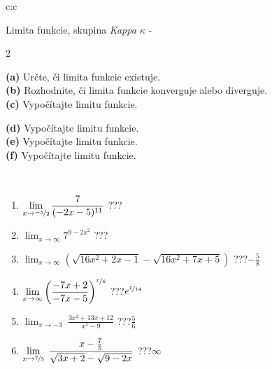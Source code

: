 \documentclass[10pt]{report}
\begin{document}
\newpage
\thispagestyle{empty}
\begin{tabular}{c:c}
\begin{minipage}[c][104.5mm][t]{0.5\linewidth}
\begin{center}
\vspace{7mm}
{\huge Limita funkcie, skupina \textit{Kappa $\kappa$} -}\\[5mm]
\begin{minipage}{0.95\linewidth}
\begin{center}
{\small \begin{multicols}{2} \raggedright
\textbf{(a)} Určte, či limita funkcie existuje. \\[1mm]
\textbf{(b)} Rozhodnite, či limita funkcie konverguje alebo diverguje. \\[1mm]
\textbf{(c)} Vypočítajte limitu funkcie. \par \columnbreak
\textbf{(d)} Vypočítajte limitu funkcie. \\[1mm]
\textbf{(e)} Vypočítajte limitu funkcie. \\[1mm]
\textbf{(f)} Vypočítajte limitu funkcie. \\[1mm]
\end{multicols}
}
\end{center}
\end{minipage}
\\[4mm]
\begin{minipage}{0.79\linewidth}
\begin{center}
\begin{varwidth}{\linewidth}
\begin{enumerate}
\normalsize
\item $\displaystyle\lim_{x\to\nicefrac{-5}{2}}{\frac{7}{(-2x-5)^{11}}}$\quad \dotfill\; ???\;\dotfill \quad {}
\item $\displaystyle\lim_{x\to\infty}{7^{9-2x^2}}$\quad \dotfill\; ???\;\dotfill \quad {}
\item $\displaystyle\lim_{x\to\infty}{\left(\sqrt{16x^2+2x-1} - \sqrt{16x^2+7x+5}\right)}$\quad \dotfill\; ???\;\dotfill \quad $-\frac{5}{8}$
\item $\displaystyle\lim_{x\to\infty}{\left( \frac{-7x+2}{-7x-5} \right)^{\nicefrac{x}{6}}}$\quad \dotfill\; ???\;\dotfill \quad $e^{\nicefrac{1}{14}}$
\item $\displaystyle\lim_{x\to -3}{\;\frac{3x^2+13x+12}{x^2-9}}$\quad \dotfill\; ???\;\dotfill \quad $\frac{5}{6}$
\item $\displaystyle\lim_{x\to \nicefrac{7}{5}}{\;\frac{x-\frac{7}{5}}{\sqrt{3x+2} - \sqrt{9-2x}}}$\quad \dotfill\; ???\;\dotfill \quad $\infty$

\end{enumerate}
\end{varwidth}
\end{center}
\end{minipage}
\end{center}
\end{minipage}
\end{tabular}
\end{document}
